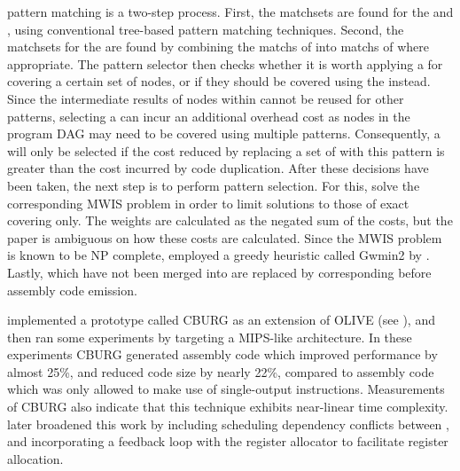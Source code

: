 \Gls{pattern matching} is a two-step process.
%
First, the \glspl{matchset} are
found for the  and \tsplitPatterns, using conventional
\gls{tree}-based \gls{pattern matching} techniques.
%
Second, the \glspl{matchset}
for the \tcomplexPatterns are found by combining the \glspl{match} of
\tsplitPatterns into \glspl{match} of \tcomplexPatterns where appropriate.
%
The
\gls{pattern selector} then checks whether it is worth applying a
\tcomplexPattern for covering a certain set of \glspl{node}, or if they should
be covered using the \tsimplePatterns instead.
%
Since the intermediate results of
\glspl{node} within \tcomplexPatterns cannot be reused for other
\glspl{pattern}, selecting a \tcomplexPattern can incur an additional overhead
cost as \glspl{node} in the \gls{program DAG} may need to be covered using
multiple \glspl{pattern}.
%
Consequently, a \tcomplexPattern will only be selected
if the cost reduced by replacing a set of \tsimplePatterns with this
\gls{pattern} is greater than the cost incurred by code duplication.
%
After these
decisions have been taken, the next step is to perform \gls{pattern
  selection}.
%
For this, \citeauthor{Scharwaechter2007} solve the corresponding
\gls{MWIS problem} in order to limit solutions to those of exact covering
only.
%
The weights are calculated as the negated sum of the \tsplitPattern costs,
but the paper is ambiguous on how these costs are calculated.
%
Since the
\gls{MWIS problem} is known to be \gls{NP complete},
\citeauthor{Scharwaechter2007} employed a greedy heuristic called \gls{Gwmin2}
by \textcite{Sakai2003}.
%
Lastly, \tsplitPatterns which have not been merged into
\tcomplexPatterns are replaced by corresponding \tsimplePatterns before
\gls{assembly code} emission.

\citeauthor{Scharwaechter2007} implemented a prototype called \gls{CBURG} as an
extension of \gls{OLIVE} (see ), and then ran some experiments
by targeting a \gls{MIPS}-like architecture.
%
In these experiments \gls{CBURG}
generated \gls{assembly code} which improved performance by almost 25\%, and
reduced code size by nearly 22\%, compared to \gls{assembly code} which was only
allowed to make use of \glspl{single-output instruction}.
%
Measurements of
\gls{CBURG} also indicate that this technique exhibits near-linear time
complexity.
%
\textcite{Ahn2009} later broadened this work by including scheduling
dependency conflicts between \tcomplexPatterns, and incorporating a feedback
loop with the \gls{register allocator} to facilitate \gls{register allocation}.

